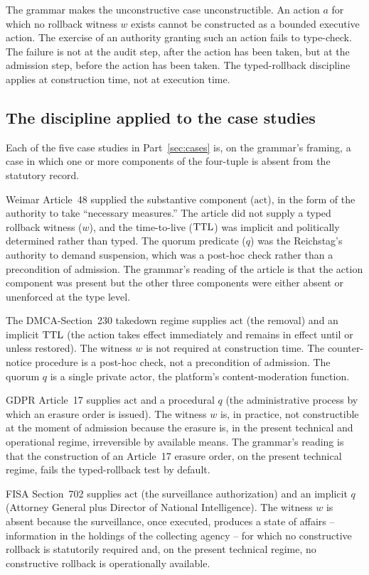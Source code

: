 The grammar makes the unconstructive case unconstructible.
An action $a$ for which no rollback witness $w$ exists cannot be constructed as a bounded executive action.
The exercise of an authority granting such an action fails to type-check.
The failure is not at the audit step, after the action has been taken,
but at the admission step, before the action has been taken.
The typed-rollback discipline applies at construction time, not at execution time.

\subsection{The discipline applied to the case studies}

Each of the five case studies in Part~\ref{sec:cases} is, on the grammar's framing,
a case in which one or more components of the four-tuple is absent from the statutory record.

Weimar Article~48 supplied the substantive component ($\text{act}$), in the form of the authority to take
``necessary measures.'' The article did not supply a typed rollback witness ($w$),
and the time-to-live ($\mathrm{TTL}$) was implicit and politically determined rather than typed.
The quorum predicate ($q$) was the Reichstag's authority to demand suspension,
which was a post-hoc check rather than a precondition of admission.
The grammar's reading of the article is that the action component was present but the other three components
were either absent or unenforced at the type level.

The DMCA-Section~230 takedown regime supplies $\text{act}$ (the removal) and an implicit $\mathrm{TTL}$
(the action takes effect immediately and remains in effect until or unless restored).
The witness $w$ is not required at construction time.
The counter-notice procedure is a post-hoc check, not a precondition of admission.
The quorum $q$ is a single private actor, the platform's content-moderation function.

GDPR Article~17 supplies $\text{act}$ and a procedural $q$ (the administrative process by which an erasure order
is issued).
The witness $w$ is, in practice, not constructible at the moment of admission because the erasure is, in the
present technical and operational regime, irreversible by available means.
The grammar's reading is that the construction of an Article~17 erasure order, on the present technical regime,
fails the typed-rollback test by default.

FISA Section~702 supplies $\text{act}$ (the surveillance authorization) and an implicit $q$ (Attorney General
plus Director of National Intelligence).
The witness $w$ is absent because the surveillance, once executed, produces a state of affairs --
information in the holdings of the collecting agency -- for which no constructive rollback is statutorily
required and, on the present technical regime, no constructive rollback is operationally available.

